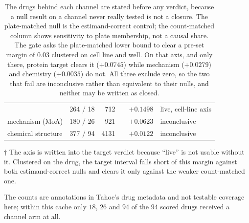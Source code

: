 \begin{table}[htbp]
\caption{ The drugs behind each channel are
stated before any verdict, because a null result on a channel never really tested
is not a closure. The plate-matched null is the estimand-correct control; the
count-matched column shows sensitivity to plate membership, not a causal share.
The gate asks the plate-matched lower bound to clear a pre-set margin of $0.03$
clustered on cell line and well. On that axis, and only there, protein target
clears it ($+0.0745$) while mechanism ($+0.0279$) and chemistry ($+0.0035$) do
not. All three exclude zero, so the two that fail are inconclusive rather than
equivalent to their nulls, and neither may be written as closed.}
\label{tab:channels}
\begin{fullwidth}
\begin{threeparttable}
\begin{tabularx}{\linewidth}{@{}L{24mm} L{24mm} r L{39mm} L{20mm} Y@{}}
 &  & 
  &  & 
  &  \\
\midrule
{} & 264 / 18 & 712 & 
  & $+0.1498$ & live, cell-line axis\tnote{$\dagger$} \\
mechanism (MoA) & 180 / 26 & 921 & 
  & $+0.0623$ & inconclusive \\
chemical structure & 377 / 94 & \num{4131}
  &  & $+0.0122$ & inconclusive \\
\end{tabularx}
\begin{tablenotes}
\item[$\dagger$] The axis is written into the target verdict because ``live'' is
not usable without it. Clustered on the drug, the target interval falls short of
this margin against both estimand-correct nulls and clears it only against the
weaker count-matched one.
\item The counts are annotations in Tahoe's drug metadata and not testable
coverage here; within this cache only $18$, $26$ and $94$ of the $94$ scored
drugs received a channel arm at all.
\end{tablenotes}
\end{threeparttable}
\end{fullwidth}
\end{table}

